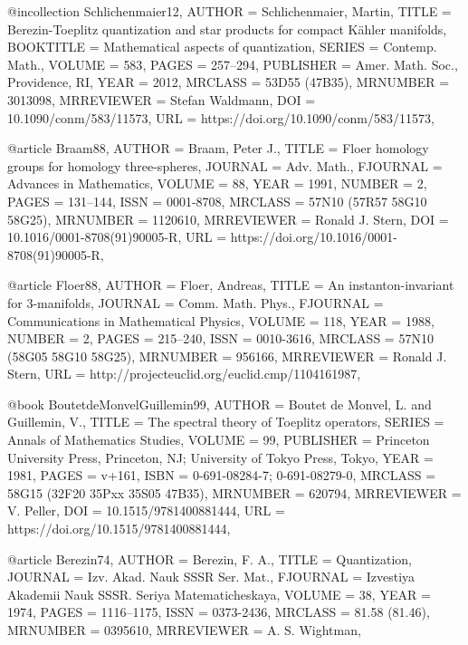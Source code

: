 @incollection {Schlichenmaier12,
    AUTHOR = {Schlichenmaier, Martin},
     TITLE = {Berezin-{T}oeplitz quantization and star products for compact
              {K}\"{a}hler manifolds},
 BOOKTITLE = {Mathematical aspects of quantization},
    SERIES = {Contemp. Math.},
    VOLUME = {583},
     PAGES = {257--294},
 PUBLISHER = {Amer. Math. Soc., Providence, RI},
      YEAR = {2012},
   MRCLASS = {53D55 (47B35)},
  MRNUMBER = {3013098},
MRREVIEWER = {Stefan Waldmann},
       DOI = {10.1090/conm/583/11573},
       URL = {https://doi.org/10.1090/conm/583/11573},
}

@article {Braam88,
    AUTHOR = {Braam, Peter J.},
     TITLE = {Floer homology groups for homology three-spheres},
   JOURNAL = {Adv. Math.},
  FJOURNAL = {Advances in Mathematics},
    VOLUME = {88},
      YEAR = {1991},
    NUMBER = {2},
     PAGES = {131--144},
      ISSN = {0001-8708},
   MRCLASS = {57N10 (57R57 58G10 58G25)},
  MRNUMBER = {1120610},
MRREVIEWER = {Ronald J. Stern},
       DOI = {10.1016/0001-8708(91)90005-R},
       URL = {https://doi.org/10.1016/0001-8708(91)90005-R},
}

@article {Floer88,
    AUTHOR = {Floer, Andreas},
     TITLE = {An instanton-invariant for {$3$}-manifolds},
   JOURNAL = {Comm. Math. Phys.},
  FJOURNAL = {Communications in Mathematical Physics},
    VOLUME = {118},
      YEAR = {1988},
    NUMBER = {2},
     PAGES = {215--240},
      ISSN = {0010-3616},
   MRCLASS = {57N10 (58G05 58G10 58G25)},
  MRNUMBER = {956166},
MRREVIEWER = {Ronald J. Stern},
       URL = {http://projecteuclid.org/euclid.cmp/1104161987},
}

@book {BoutetdeMonvelGuillemin99,
    AUTHOR = {Boutet de Monvel, L. and Guillemin, V.},
     TITLE = {The spectral theory of {T}oeplitz operators},
    SERIES = {Annals of Mathematics Studies},
    VOLUME = {99},
 PUBLISHER = {Princeton University Press, Princeton, NJ; University of Tokyo
              Press, Tokyo},
      YEAR = {1981},
     PAGES = {v+161},
      ISBN = {0-691-08284-7; 0-691-08279-0},
   MRCLASS = {58G15 (32F20 35Pxx 35S05 47B35)},
  MRNUMBER = {620794},
MRREVIEWER = {V. Peller},
       DOI = {10.1515/9781400881444},
       URL = {https://doi.org/10.1515/9781400881444},
}

@article {Berezin74,
    AUTHOR = {Berezin, F. A.},
     TITLE = {Quantization},
   JOURNAL = {Izv. Akad. Nauk SSSR Ser. Mat.},
  FJOURNAL = {Izvestiya Akademii Nauk SSSR. Seriya Matematicheskaya},
    VOLUME = {38},
      YEAR = {1974},
     PAGES = {1116--1175},
      ISSN = {0373-2436},
   MRCLASS = {81.58 (81.46)},
  MRNUMBER = {0395610},
MRREVIEWER = {A. S. Wightman},
}

